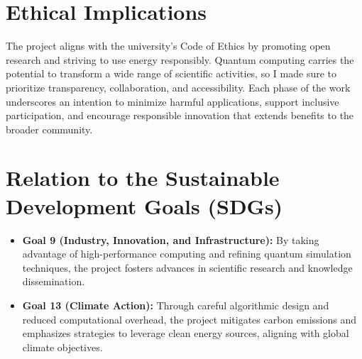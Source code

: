 \section{Ethical Implications}
The project aligns with the university’s Code of Ethics by promoting open research and striving to use energy responsibly. Quantum computing carries the potential to transform a wide range of scientific activities, so I made sure to prioritize transparency, collaboration, and accessibility. Each phase of the work underscores an intention to minimize harmful applications, support inclusive participation, and encourage responsible innovation that extends benefits to the broader community.

\section{Relation to the Sustainable Development Goals (SDGs)}
\begin{itemize}
    \item \textbf{Goal 9 (Industry, Innovation, and Infrastructure):}  
    By taking advantage of high-performance computing and refining quantum simulation techniques, the project fosters advances in scientific research and knowledge dissemination.
    \item \textbf{Goal 13 (Climate Action):}  
    Through careful algorithmic design and reduced computational overhead, the project mitigates carbon emissions and emphasizes strategies to leverage clean energy sources, aligning with global climate objectives.
\end{itemize}